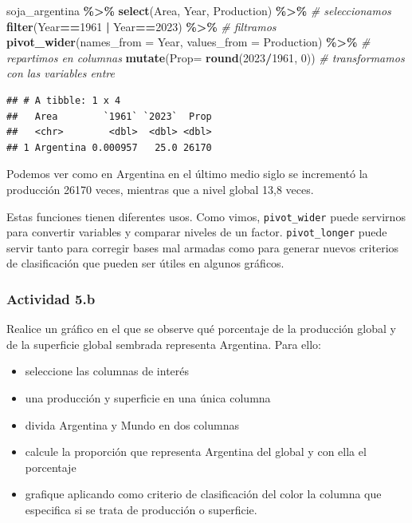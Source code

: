 \documentclass[
]{article}
\newenvironment{Shaded}{\begin{snugshade}}{\end{snugshade}}
\newcommand{\AttributeTok}[1]{\textcolor[rgb]{0.13,0.29,0.53}{#1}}
\newcommand{\CommentTok}[1]{\textcolor[rgb]{0.56,0.35,0.01}{\textit{#1}}}
\newcommand{\DecValTok}[1]{\textcolor[rgb]{0.00,0.00,0.81}{#1}}
\newcommand{\FunctionTok}[1]{\textcolor[rgb]{0.13,0.29,0.53}{\textbf{#1}}}
\newcommand{\NormalTok}[1]{#1}
\newcommand{\SpecialCharTok}[1]{\textcolor[rgb]{0.81,0.36,0.00}{\textbf{#1}}}
\newcommand{\StringTok}[1]{\textcolor[rgb]{0.31,0.60,0.02}{#1}}
\providecommand{\tightlist}{%
  \setlength{\itemsep}{0pt}\setlength{\parskip}{0pt}}
\begin{document}
\begin{Shaded}
\begin{Highlighting}[]
\NormalTok{soja\_argentina }\SpecialCharTok{\%\textgreater{}\%} \FunctionTok{select}\NormalTok{(Area, Year, Production) }\SpecialCharTok{\%\textgreater{}\%} \CommentTok{\# seleccionamos}
  \FunctionTok{filter}\NormalTok{(Year}\SpecialCharTok{==}\DecValTok{1961} \SpecialCharTok{|}\NormalTok{ Year}\SpecialCharTok{==}\DecValTok{2023}\NormalTok{) }\SpecialCharTok{\%\textgreater{}\%}  \CommentTok{\# filtramos}
  \FunctionTok{pivot\_wider}\NormalTok{(}\AttributeTok{names\_from =}\NormalTok{  Year, }\AttributeTok{values\_from =}\NormalTok{ Production) }\SpecialCharTok{\%\textgreater{}\%} \CommentTok{\# repartimos en columnas}
  \FunctionTok{mutate}\NormalTok{(}\AttributeTok{Prop=} \FunctionTok{round}\NormalTok{(}\StringTok{\textasciigrave{}}\AttributeTok{2023}\StringTok{\textasciigrave{}}\SpecialCharTok{/}\StringTok{\textasciigrave{}}\AttributeTok{1961}\StringTok{\textasciigrave{}}\NormalTok{, }\DecValTok{0}\NormalTok{)) }\CommentTok{\# transformamos con las variables entre \textasciigrave{} \textasciigrave{}}
\end{Highlighting}
\end{Shaded}

\begin{verbatim}
## # A tibble: 1 x 4
##   Area        `1961` `2023`  Prop
##   <chr>        <dbl>  <dbl> <dbl>
## 1 Argentina 0.000957   25.0 26170
\end{verbatim}

Podemos ver como en Argentina en el último medio siglo se incrementó la
producción 26170 veces, mientras que a nivel global 13,8 veces.

Estas funciones tienen diferentes usos. Como vimos,
\texttt{pivot\_wider} puede servirnos para convertir variables y
comparar niveles de un factor. \texttt{pivot\_longer} puede servir tanto
para corregir bases mal armadas como para generar nuevos criterios de
clasificación que pueden ser útiles en algunos gráficos.

\subsubsection{Actividad 5.b}\label{actividad-5.b}

Realice un gráfico en el que se observe qué porcentaje de la producción
global y de la superficie global sembrada representa Argentina. Para
ello:

\begin{itemize}
\tightlist
\item
  seleccione las columnas de interés
\item
  una producción y superficie en una única columna
\item
  divida Argentina y Mundo en dos columnas
\item
  calcule la proporción que representa Argentina del global y con ella
  el porcentaje
\item
  grafique aplicando como criterio de clasificación del color la columna
  que especifica si se trata de producción o superficie.
\end{itemize}
\end{document}
